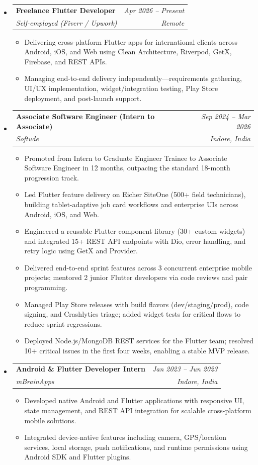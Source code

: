 \documentclass[a4paper,10pt]{article}
\makeatletter
\newcommand{\resumeSubheading}[4]{
  \vspace{2pt}\item
  \begin{tabular*}{\textwidth}{l@{\extracolsep{\fill}}r}
    \textbf{#1} & \textit{\small #2} \\
    \small\textit{#3} & \textit{\small #4} \\
  \end{tabular*}\vspace{-4pt}
}
\newcommand{\resumeItem}[1]{\item\small{#1\vspace{-1pt}}}
\makeatother
\begin{document}
\begin{itemize}[leftmargin=0.15in, label={}]

\resumeSubheading
  {Freelance Flutter Developer}{Apr 2026 -- Present}
  {Self-employed (Fiverr / Upwork)}{Remote}
\begin{itemize}[leftmargin=*]
  \resumeItem{Delivering cross-platform Flutter apps for international clients across Android, iOS, and Web using Clean Architecture, Riverpod, GetX, Firebase, and REST APIs.}
  \resumeItem{Managing end-to-end delivery independently---requirements gathering, UI/UX implementation, widget/integration testing, Play Store deployment, and post-launch support.}
\end{itemize}

\vspace{4pt}

\resumeSubheading
  {Associate Software Engineer (Intern to Associate)}{Sep 2024 -- Mar 2026}
  {Softude}{Indore, India}
\begin{itemize}[leftmargin=*]
  \resumeItem{Promoted from Intern to Graduate Engineer Trainee to Associate Software Engineer in 12 months, outpacing the standard 18-month progression track.}
  \resumeItem{Led Flutter feature delivery on Eicher SiteOne (500+ field technicians), building tablet-adaptive job card workflows and enterprise UIs across Android, iOS, and Web.}
  \resumeItem{Engineered a reusable Flutter component library (30+ custom widgets) and integrated 15+ REST API endpoints with Dio, error handling, and retry logic using GetX and Provider.}
  \resumeItem{Delivered end-to-end sprint features across 3 concurrent enterprise mobile projects; mentored 2 junior Flutter developers via code reviews and pair programming.}
  \resumeItem{Managed Play Store releases with build flavors (dev/staging/prod), code signing, and Crashlytics triage; added widget tests for critical flows to reduce sprint regressions.}
  \resumeItem{Deployed Node.js/MongoDB REST services for the Flutter team; resolved 10+ critical issues in the first four weeks, enabling a stable MVP release.}
\end{itemize}

\vspace{4pt}

\resumeSubheading
  {Android \& Flutter Developer Intern}{Jan 2023 -- Jun 2023}
  {mBrainApps}{Indore, India}
\begin{itemize}[leftmargin=*]
  \resumeItem{Developed native Android and Flutter applications with responsive UI, state management, and REST API integration for scalable cross-platform mobile solutions.}
  \resumeItem{Integrated device-native features including camera, GPS/location services, local storage, push notifications, and runtime permissions using Android SDK and Flutter plugins.}
\end{itemize}

\end{itemize}
\end{document}
